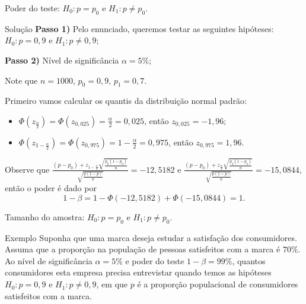 \documentclass[8pt]{beamer}
\begin{document}
\begin{frame}{Poder do teste: $H_0: p = p_0$ e $H_1: p \neq p_0$.}

\begin{block}{Solução}
	\textbf{Passo 1)} Pelo enunciado, queremos testar as seguintes hipóteses: $H_0: p=0,9$ e $H_1:p \neq 0,9$;
	
	\textbf{Passo 2)} Nível de significância $\alpha=5\%$;
	
	
	Note que $n=1000$, $p_0=0,9$, $p_1=0,7$.
	
	Primeiro vamos calcular os quantis da distribuição normal padrão:
	\begin{itemize}
		\item $\Phi(z_\frac{\alpha}{2}) = \Phi(z_{0,025}) = \frac{\alpha}{2} = 0,025$, então $z_{0,025} = -1,96$;
		\item $\Phi(z_{1-\frac{\alpha}{2}}) = \Phi(z_{0,975}) = 1-\frac{\alpha}{2} = 0,975$, então $z_{0,975} = 1,96$.
	\end{itemize}
	
	 Observe que $\frac{ (p - p_0) + z_{1-\frac{\alpha}{2}}\sqrt{\frac{p_0(1-p_0)}{n}} }{ \sqrt{\frac{p(1-p)}{n}} } = -12,5182$ e $\frac{ (p - p_0) + z_\frac{\alpha}{2}\sqrt{\frac{p_0(1-p_0)}{n}} }{ \sqrt{\frac{p(1-p)}{n}} } = -15,0844$, então o poder é dado por
	$$1 - \beta = 1 - \Phi(-12,5182) + \Phi\left(-15,0844\right)=1.$$
\end{block}

\end{frame}

\begin{frame}{Tamanho do amostra: $H_0: p = p_0$ e $H_1: p \neq p_0$.}

\large
\begin{block}{Exemplo}
	Suponha que uma marca deseja estudar a satisfação dos consumidores. Assuma que a proporção na população de pessoas satisfeitos com a marca é $70\%$. Ao nível de significância $\alpha=5\%$ e poder do teste $1-\beta = 99\%$, quantos consumidores esta empresa precisa entrevistar quando temos as hipóteses $H_0: p = 0,9$ e $H_1: p\neq 0,9$, em que $p$ é a proporção populacional de consumidores satisfeitos com a marca.
\end{block}
\normalsize

\end{frame}
\end{document}
